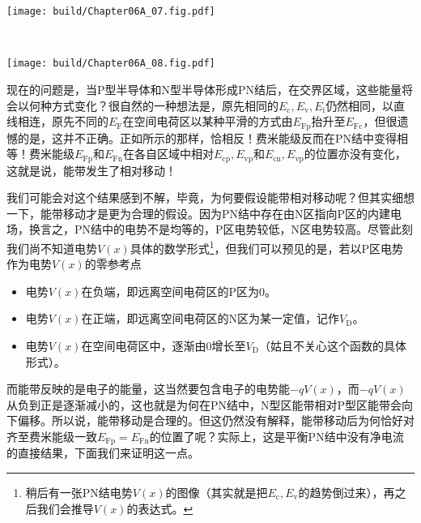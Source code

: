 \vspace{0.25cm}
\begin{Figure}[平衡PN结的能带图]
    \begin{FigureSub}[P型和N型半导体的能带图]
        \texttt{[image: build/Chapter06A\_07.fig.pdf]}
    \end{FigureSub}
    \\ \vspace{1cm}
    \begin{FigureSub}[PN结的能带图]
        \texttt{[image: build/Chapter06A\_08.fig.pdf]}
    \end{FigureSub}
\end{Figure}
现在的问题是，当P型半导体和N型半导体形成PN结后，在交界区域，这些能量将会以何种方式变化？很自然的一种想法是，原先相同的$E_\text{c},E_\text{v},E_\text{i}$仍然相同，以直线相连，原先不同的$E_\text{F}$在空间电荷区以某种平滑的方式由$E_\text{Fp}$抬升至$E_\text{Fc}$，但很遗憾的是，这并不正确。正如所示的那样，恰相反！费米能级反而在PN结中变得相等！费米能级$E_\text{Fp}$和$E_\text{Fn}$在各自区域中相对$E_\text{cp},E_\text{vp}$和$E_\text{cn},E_\text{vp}$的位置亦没有变化，这就是说，能带发生了相对移动！\goodbreak

我们可能会对这个结果感到不解，毕竟，为何要假设能带相对移动呢？但其实细想一下，能带移动才是更为合理的假设。因为PN结中存在由N区指向P区的内建电场，换言之，PN结中的电势不是均等的，P区电势较低，N区电势较高。尽管此刻我们尚不知道电势$V(x)$具体的数学形式\footnote{稍后有一张PN结电势$V(x)$的图像（其实就是把$E_\text{c},E_\text{v}$的趋势倒过来），再之后我们会推导$V(x)$的表达式。}，但我们可以预见的是，若以P区电势作为电势$V(x)$的零参考点
\begin{itemize}
    \item 电势$V(x)$在负端，即远离空间电荷区的P区为$0$。
    \item 电势$V(x)$在正端，即远离空间电荷区的N区为某一定值，记作$V_\text{D}$。
    \item 电势$V(x)$在空间电荷区中，逐渐由$0$增长至$V_\text{D}$（姑且不关心这个函数的具体形式）。
\end{itemize}

而能带反映的是电子的能量，这当然要包含电子的电势能$-qV(x)$，而$-qV(x)$从负到正是逐渐减小的，这也就是为何在PN结中，N型区能带相对P型区能带会向下偏移。所以说，能带移动是合理的。但这仍然没有解释，能带移动后为何恰好对齐至费米能级一致$E_\text{Fp}=E_\text{Fn}$的位置了呢？实际上，这是平衡PN结中没有净电流的直接结果，下面我们来证明这一点。

